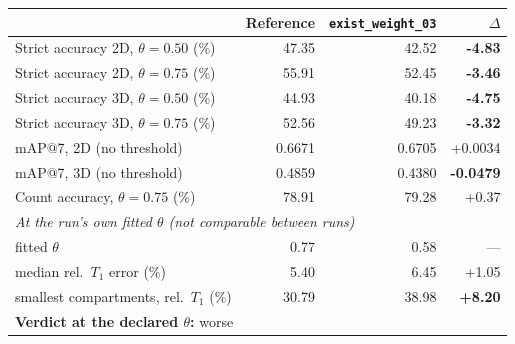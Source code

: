 \renewcommand{\arraystretch}{1.05}
\begin{tabular}{lrrr}
\toprule
 & Reference & \texttt{exist\_weight\_03} & $\Delta$ \\
\midrule
Strict accuracy 2D, $\theta = 0.50$ (\%) & 47.35 & 42.52 & \textbf{-4.83} \\
Strict accuracy 2D, $\theta = 0.75$ (\%) & 55.91 & 52.45 & \textbf{-3.46} \\
Strict accuracy 3D, $\theta = 0.50$ (\%) & 44.93 & 40.18 & \textbf{-4.75} \\
Strict accuracy 3D, $\theta = 0.75$ (\%) & 52.56 & 49.23 & \textbf{-3.32} \\
\midrule
mAP@7, 2D (no threshold) & 0.6671 & 0.6705 & +0.0034 \\
mAP@7, 3D (no threshold) & 0.4859 & 0.4380 & \textbf{-0.0479} \\
\midrule
Count accuracy, $\theta = 0.75$ (\%) & 78.91 & 79.28 & +0.37 \\
\midrule
\multicolumn{4}{l}{\emph{At the run's own fitted $\theta$ (not comparable between runs)}} \\
\quad fitted $\theta$ & 0.77 & 0.58 & --- \\
\quad median rel.\ $T_1$ error (\%) & 5.40 & 6.45 & +1.05 \\
\quad smallest compartments, rel.\ $T_1$ (\%) & 30.79 & 38.98 & \textbf{+8.20} \\
\midrule
\multicolumn{4}{l}{\textbf{Verdict at the declared $\theta$:} worse} \\
\bottomrule
\end{tabular}
